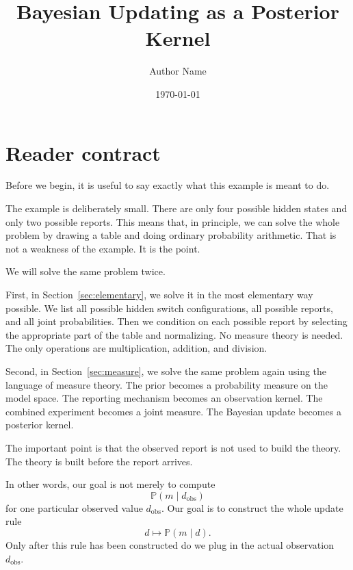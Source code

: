 \documentclass[11pt]{article}
\title{Bayesian Updating as a Posterior Kernel}
\author{Author Name}
\date{\today}
\newcommand{\dobs}{d_{\mathrm{obs}}}
\begin{document}
\maketitle
\tableofcontents

\begin{abstract}
\end{abstract}

\section*{Reader contract}

Before we begin, it is useful to say exactly what this example is meant to do.

The example is deliberately small. There are only four possible hidden states and only two possible reports. This means that, in principle, we can solve the whole problem by drawing a table and doing ordinary probability arithmetic. That is not a weakness of the example. It is the point.

We will solve the same problem twice.

First, in Section~\ref{sec:elementary}, we solve it in the most elementary way possible. We list all possible hidden switch configurations, all possible reports, and all joint probabilities. Then we condition on each possible report by selecting the appropriate part of the table and normalizing. No measure theory is needed. The only operations are multiplication, addition, and division.

Second, in Section~\ref{sec:measure}, we solve the same problem again using the language of measure theory. The prior becomes a probability measure on the model space. The reporting mechanism becomes an observation kernel. The combined experiment becomes a joint measure. The Bayesian update becomes a posterior kernel.

The important point is that the observed report is not used to build the theory. The theory is built before the report arrives.

In other words, our goal is not merely to compute
\[
    \mathbb{P}(m \mid \dobs)
\]
for one particular observed value \(\dobs\). Our goal is to construct the whole update rule
\[
    d \longmapsto \mathbb{P}(m \mid d).
\]
Only after this rule has been constructed do we plug in the actual observation \(\dobs\).
\end{document}
